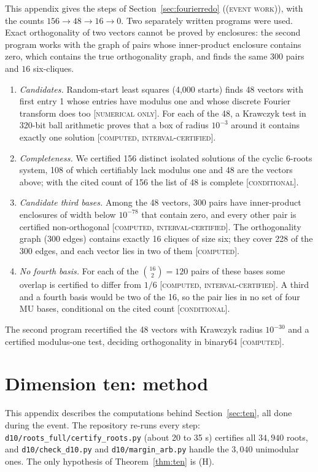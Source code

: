 \documentclass[11pt]{article}
\newcommand{\st}[1]{\textsc{[#1]}}
\newcommand{\stcert}{\st{computed, interval-certified}}
\newcommand{\stcomp}{\st{computed}}
\newcommand{\stnum}{\st{numerical only}}
\newcommand{\stcond}{\st{conditional}}
\newcommand{\event}{\textsc{(event work)}}
\theoremstyle{definition}
\theoremstyle{remark}
\begin{document}
\noindent This appendix gives the steps of Section~\ref{sec:fourierredo} (\event), with the counts
$156\to48\to16\to0$. Two separately written programs were used. Exact orthogonality of two vectors cannot be proved by enclosures: the
second program works with the graph of pairs whose inner-product enclosure contains zero, which contains the true
orthogonality graph, and finds the same $300$ pairs and $16$ six-cliques.
\begin{enumerate}
\item \emph{Candidates.} Random-start least squares (4{,}000 starts) finds 48 vectors with first entry 1 whose entries have
modulus one and whose discrete Fourier transform does too \stnum. For each of the 48, a Krawczyk test in 320-bit ball
arithmetic proves that a box of radius $10^{-3}$ around it contains exactly one solution \stcert.
\item \emph{Completeness.} We certified 156 distinct isolated solutions of the cyclic 6-roots system, 108 of which
certifiably lack modulus one and 48 are the vectors above; with the cited count of 156 \cite{BF91} the list of 48 is
complete \stcond.
\item \emph{Candidate third bases.} Among the 48 vectors, 300 pairs have inner-product enclosures of width below
$10^{-78}$ that contain zero, and every other pair is certified non-orthogonal \stcert. The orthogonality graph (300 edges)
contains exactly 16 cliques of size six; they cover 228 of the 300 edges, and each vector lies in two of them \stcomp.
\item \emph{No fourth basis.} For each of the $\binom{16}2=120$ pairs of these bases some overlap is certified to differ
from $1/6$ \stcert. A third and a fourth basis would be two of the 16, so the pair lies in no set of four MU bases,
conditional on the cited count \stcond.
\end{enumerate}
The second program recertified the 48 vectors with Krawczyk radius $10^{-30}$ and a certified modulus-one test, deciding
orthogonality in binary64 \stcomp.

\section{Dimension ten: method}\label{app:ten}

\noindent This appendix describes the computations behind Section~\ref{sec:ten}, all done during the event. The repository
re-runs every step: \texttt{d10/roots\_full/certify\_roots.py} (about 20 to 35 s) certifies all $34{,}940$ roots, and
\texttt{d10/check\_d10.py} and \texttt{d10/margin\_arb.py} handle the $3{,}040$ unimodular ones. The only hypothesis of
Theorem~\ref{thm:ten} is (H).
\end{document}
